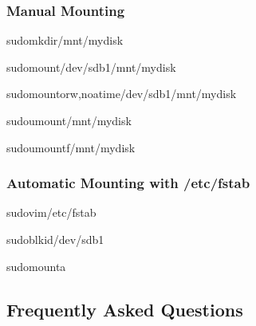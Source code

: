 \documentclass[letterpaper,10pt,english]{sphinxmanual}
\begin{document}
\subsubsection{Manual Mounting}
\label{\detokenize{disk-management:manual-mounting}}
\begin{sphinxVerbatim}[commandchars=\\\{\}]
sudomkdir/mnt/mydisk

sudomount/dev/sdb1/mnt/mydisk

sudomount\PYGZhy{}orw,noatime/dev/sdb1/mnt/mydisk

sudoumount/mnt/mydisk

sudoumount\PYGZhy{}f/mnt/mydisk
\end{sphinxVerbatim}


\subsubsection{Automatic Mounting with /etc/fstab}
\label{\detokenize{disk-management:automatic-mounting-with-etc-fstab}}
\begin{sphinxVerbatim}[commandchars=\\\{\}]
sudovim/etc/fstab


sudoblkid/dev/sdb1

sudomount\PYGZhy{}a
\end{sphinxVerbatim}


\subsection{Frequently Asked Questions}
\label{\detokenize{disk-management:frequently-asked-questions}}
\end{document}
